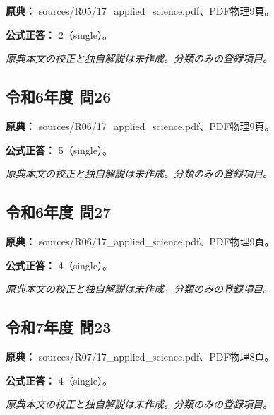 \noindent\textbf{原典：} sources/R05/17\_applied\_science.pdf、PDF物理9頁。

\textbf{公式正答：} 2（single）。

\par\textit{原典本文の校正と独自解説は未作成。分類のみの登録項目。}

\subsection{令和6年度 問26}
\label{q:r06-reg-applied-26}

\noindent\textbf{原典：} sources/R06/17\_applied\_science.pdf、PDF物理9頁。

\textbf{公式正答：} 5（single）。

\par\textit{原典本文の校正と独自解説は未作成。分類のみの登録項目。}

\subsection{令和6年度 問27}
\label{q:r06-reg-applied-27}

\noindent\textbf{原典：} sources/R06/17\_applied\_science.pdf、PDF物理9頁。

\textbf{公式正答：} 4（single）。

\par\textit{原典本文の校正と独自解説は未作成。分類のみの登録項目。}

\subsection{令和7年度 問23}
\label{q:r07-reg-applied-23}

\noindent\textbf{原典：} sources/R07/17\_applied\_science.pdf、PDF物理8頁。

\textbf{公式正答：} 4（single）。

\par\textit{原典本文の校正と独自解説は未作成。分類のみの登録項目。}
